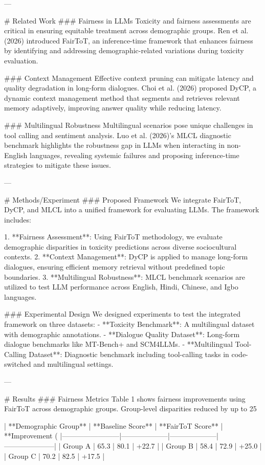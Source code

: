 ---

# Related Work  
### Fairness in LLMs  
Toxicity and fairness assessments are critical in ensuring equitable treatment across demographic groups. Ren et al. (2026) introduced FairToT, an inference-time framework that enhances fairness by identifying and addressing demographic-related variations during toxicity evaluation.

### Context Management  
Effective context pruning can mitigate latency and quality degradation in long-form dialogues. Choi et al. (2026) proposed DyCP, a dynamic context management method that segments and retrieves relevant memory adaptively, improving answer quality while reducing latency.

### Multilingual Robustness  
Multilingual scenarios pose unique challenges in tool calling and sentiment analysis. Luo et al. (2026)’s MLCL diagnostic benchmark highlights the robustness gap in LLMs when interacting in non-English languages, revealing systemic failures and proposing inference-time strategies to mitigate these issues.

---

# Methods/Experiment  
### Proposed Framework  
We integrate FairToT, DyCP, and MLCL into a unified framework for evaluating LLMs. The framework includes:

1. **Fairness Assessment**: Using FairToT methodology, we evaluate demographic disparities in toxicity predictions across diverse sociocultural contexts.
2. **Context Management**: DyCP is applied to manage long-form dialogues, ensuring efficient memory retrieval without predefined topic boundaries.
3. **Multilingual Robustness**: MLCL benchmark scenarios are utilized to test LLM performance across English, Hindi, Chinese, and Igbo languages.

### Experimental Design  
We designed experiments to test the integrated framework on three datasets:
- **Toxicity Benchmark**: A multilingual dataset with demographic annotations.
- **Dialogue Quality Dataset**: Long-form dialogue benchmarks like MT-Bench+ and SCM4LLMs.
- **Multilingual Tool-Calling Dataset**: Diagnostic benchmark including tool-calling tasks in code-switched and multilingual settings.

---

# Results  
### Fairness Metrics  
Table 1 shows fairness improvements using FairToT across demographic groups. Group-level disparities reduced by up to 25%

| **Demographic Group** | **Baseline Score** | **FairToT Score** | **Improvement (%
|------------------------|--------------------|--------------------|---------------------|
| Group A               | 65.3              | 80.1              | +22.7               |
| Group B               | 58.4              | 72.9              | +25.0               |
| Group C               | 70.2              | 82.5              | +17.5               |

